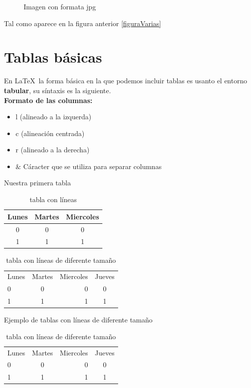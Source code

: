 \documentclass[12pt]{article}
\begin{document}
\begin{figure}[!ht]
\caption{Imagen con formata jpg}
\label{figuraVarias}
\end{figure}

Tal como aparece en la figura anterior \eqref{figuraVarias}

\section{Tablas básicas}
En \LaTeX \, la forma básica en la que podemos incluir tablas es usanto el entorno \textbf{tabular}, su síntaxis es la siguiente.\\[0.3cm]
\noindent \textbf{Formato de las columnas:}
\begin{itemize}
\item l (alineado a la izquerda)
\item c (alineación centrada)
\item r (alineado a la derecha)
\end{itemize}
\begin{itemize}
\item $\&$ Cáracter que se utiliza para separar columnas
\end{itemize}
	
Nuestra primera tabla \quad
\begin{table}[!ht]
\centering
\begin{tabular}{ccc}
\hline
Lunes & Martes & Miercoles \\
\hline
0 & 0 & 0 \\
\hline
1 & 1 & 1 \\
\hline
\end{tabular}
\caption{tabla con líneas}
\label{incluirimagen}
\end{table}

\begin{table}[!ht]
\centering
\begin{tabular}{|l|c|r|c|}
\hline
Lunes & Martes & Miercoles & Jueves\\
\cline{1-2}
0 & 0 & 0 & 0 \\
\cline{1-3}
1 & 1 & 1 & 1 \\
\hline
\end{tabular}
\caption{tabla con líneas de diferente tamaño}
\label{lineas}
\end{table}
\newpage
Ejemplo de tablas con líneas de diferente tamaño

\begin{table}[H]
\centering
\begin{tabular}{|l|c|r|c|}
\hline
Lunes & Martes & Miercoles & Jueves\\
\cline{2-4}
0 & 0 & 0 & 0 \\
\cline{3-4}
1 & 1 & 1 & 1 \\
\hline
\end{tabular}
\caption{tabla con líneas de diferente tamaño}
\label{lineas}
\end{table}
\end{document}
